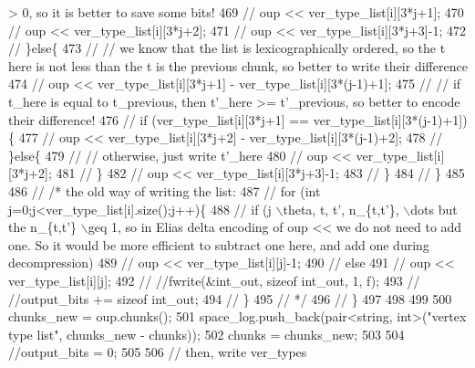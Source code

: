 \begin{DoxyCode}
{       > 0, so it is better to save some bits!}
469   \textcolor{comment}{//       oup << ver\_type\_list[i][3*j+1];}
470   \textcolor{comment}{//       oup << ver\_type\_list[i][3*j+2];}
471   \textcolor{comment}{//       oup << ver\_type\_list[i][3*j+3]-1;}
472   \textcolor{comment}{//     \}else\{}
473   \textcolor{comment}{//       // we know that the list is lexicographically ordered, so the t here is not less than the t is
       the previous chunk, so better to write their difference}
474   \textcolor{comment}{//       oup << ver\_type\_list[i][3*j+1] - ver\_type\_list[i][3*(j-1)+1];}
475   \textcolor{comment}{//       // if t\_here is equal to t\_previous, then t'\_here >= t'\_previous, so better to encode their
       difference!}
476   \textcolor{comment}{//       if (ver\_type\_list[i][3*j+1] == ver\_type\_list[i][3*(j-1)+1])\{}
477   \textcolor{comment}{//         oup << ver\_type\_list[i][3*j+2] - ver\_type\_list[i][3*(j-1)+2];}
478   \textcolor{comment}{//       \}else\{}
479   \textcolor{comment}{//         // otherwise, just write t'\_here}
480   \textcolor{comment}{//         oup << ver\_type\_list[i][3*j+2];}
481   \textcolor{comment}{//       \}}
482   \textcolor{comment}{//       oup << ver\_type\_list[i][3*j+3]-1;}
483   \textcolor{comment}{//     \}}
484   \textcolor{comment}{//   \}}
485 
486   \textcolor{comment}{//   /* the old way of writing the list:}
487   \textcolor{comment}{//   for (int j=0;j<ver\_type\_list[i].size();j++)\{}
488   \textcolor{comment}{//     if (j%
       \(\backslash\)theta, t, t', n\_\{t,t'\}, \(\backslash\)dots but the n\_\{t,t'\} \(\backslash\)geq 1, so in Elias delta encoding of oup << we do not need to
       add one. So it would be more efficient to subtract one here, and add one during decompression)}
489   \textcolor{comment}{//       oup << ver\_type\_list[i][j]-1;}
490   \textcolor{comment}{//     else}
491   \textcolor{comment}{//       oup << ver\_type\_list[i][j];}
492   \textcolor{comment}{//     //fwrite(&int\_out, sizeof int\_out, 1, f);}
493   \textcolor{comment}{//     //output\_bits += sizeof int\_out;}
494   \textcolor{comment}{//   \}}
495   \textcolor{comment}{//   */}
496   \textcolor{comment}{// \}}
497 
498 
499 
500   chunks\_new = oup.chunks();
501   space\_log.push\_back(pair<string, int>(\textcolor{stringliteral}{"vertex type list"}, chunks\_new - chunks));
502   chunks = chunks\_new;
503 
504   \textcolor{comment}{//output\_bits = 0;}
505   
506   \textcolor{comment}{// then, write ver\_types}

\end{DoxyCode}
